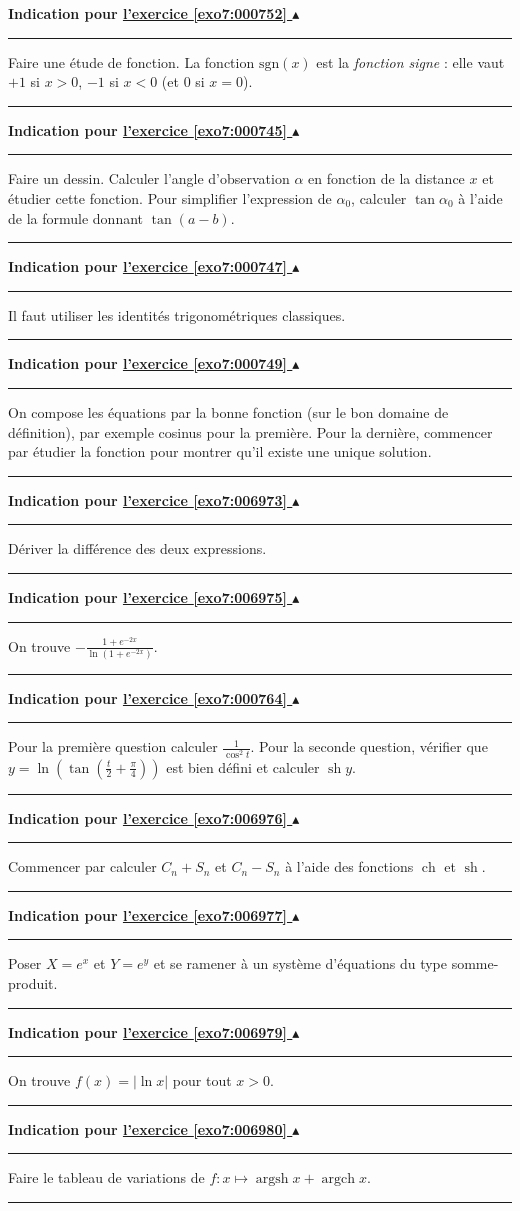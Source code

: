 \documentclass[11pt,a4paper]{article}
\newcommand{\ch}{\mathop{\mathrm{ch}}\nolimits}
\newcommand{\sh}{\mathop{\mathrm{sh}}\nolimits}
\newcommand{\Argsh}{\mathop{\mathrm{argsh}}\nolimits}
\newcommand{\Argch}{\mathop{\mathrm{argch}}\nolimits}
\newcommand{\finexercice}{}
\newcommand{\noindication}{}
\newcounter{exo}
\newcommand{\indication}[1]{\hypertarget{ind7:#1}{}\label{ind7:#1}{\bf Indication pour \hyperlink{exo7:#1}{l'exercice \ref{exo7:#1} $\blacktriangle$}}\vspace{1mm}\hrule\vspace{1mm}}
\newcommand{\finindication}{\vspace{1mm}\hrule\vspace*{7mm}}
\newcommand{\finenonces}{\newpage}
\newcommand{\finindications}{\newpage}
\begin{document}
\finexercice

\finfiche

 \finenonces 



 \finindications 

\indication{000752}
Faire une étude de fonction.
La fonction $\text{sgn}(x)$ est la \emph{fonction signe} : elle vaut $+1$ si $x> 0$,
$-1$ si $x < 0$ (et $0$ si $x=0$).
\finindication
\indication{000745}
Faire un dessin. Calculer l'angle d'observation $\alpha$ en fonction de la distance $x$
et étudier cette fonction. Pour simplifier l'expression de $\alpha_0$, 
calculer $\tan\alpha_0$ à l'aide de la formule donnant $\tan(a-b)$.
\finindication
\indication{000747}
Il faut utiliser les identités trigonométriques classiques.
\finindication
\indication{000749}
On compose les équations par la bonne fonction (sur le bon domaine de définition), 
par exemple cosinus pour la premi\`ere. Pour la dernière, commencer par 
étudier la fonction pour montrer qu'il existe une unique solution.
\finindication
\indication{006973}
Dériver la différence des deux expressions.
\finindication
\noindication
\indication{006975}
On trouve $-\frac{1+e^{-2x}}{\ln(1+e^{-2x})}$.
\finindication
\indication{000764}
Pour la première question calculer $\frac{1}{\cos^2t}$.
Pour la seconde question, vérifier que 
$y=\ln \left(\tan\left(\frac{t}{2}+\frac{\pi}{4}\right)\right)$ 
est bien défini et calculer $\sh y$.
\finindication
\indication{006976}
Commencer par calculer $C_n+S_n$ et $C_n-S_n$ à l'aide des fonctions $\ch$ et $\sh$.
\finindication
\indication{006977}
Poser $X=e^x$ et $Y=e^y$ et se ramener à un système d'équations du type somme-produit.
\finindication
\noindication
\indication{006979}
On trouve $f(x)=|\ln x|$ pour tout $x>0$.
\finindication
\indication{006980}
Faire le tableau de variations de $f:x\mapsto\Argsh x+\Argch x$.
\finindication


\newpage
\end{document}
